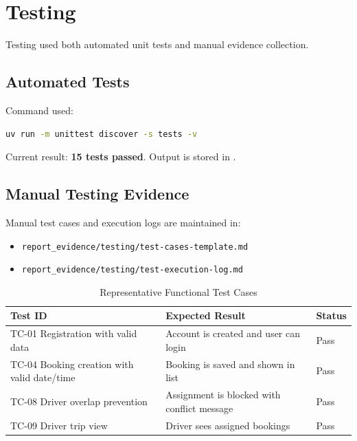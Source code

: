 \documentclass[12pt,a4paper]{article}
\begin{document}
\section{Testing}
Testing used both automated unit tests and manual evidence collection.

\subsection*{Automated Tests}
Command used:
\begin{lstlisting}[language=bash]
uv run -m unittest discover -s tests -v
\end{lstlisting}

Current result: \textbf{15 tests passed}. Output is stored in .

\subsection*{Manual Testing Evidence}
Manual test cases and execution logs are maintained in:
\begin{itemize}[noitemsep]
    \item \texttt{report\_evidence/testing/test-cases-template.md}
    \item \texttt{report\_evidence/testing/test-execution-log.md}
\end{itemize}

\begin{table}[H]
\centering
\caption{Representative Functional Test Cases}
\label{tab:test-cases}
\begin{tabularx}{\textwidth}{l Y Y}
\toprule
\textbf{Test ID} & \textbf{Expected Result} & \textbf{Status} \\
\midrule
TC-01 Registration with valid data & Account is created and user can login & Pass \\
TC-04 Booking creation with valid date/time & Booking is saved and shown in list & Pass \\
TC-08 Driver overlap prevention & Assignment is blocked with conflict message & Pass \\
TC-09 Driver trip view & Driver sees assigned bookings & Pass \\
\bottomrule
\end{tabularx}
\end{table}
\end{document}
